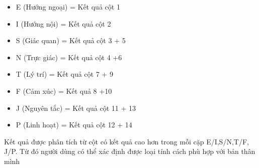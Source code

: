 \begin{itemize}
    \setlength\itemsep{0em}
    \item E (Hướng ngoại) = Kết quả cột 1
    \item I (Hướng nội) = Kết quả cột 2
    \item S (Giác quan)  = Kết quả cột 3 + 5
    \item N (Trực giác) = Kết quả cột 4 +6
    \item T (Lý trí) = Kết quả cột 7 + 9
    \item F (Cảm xúc) = Kết quả 8 +10
    \item J (Nguyên tắc)  = Kết quả cột 11 + 13
    \item P (Linh hoạt) = Kết quả cột 12 + 14
\end{itemize}
Kết quả được phân tích từ cột có kết quả cao hơn trong mỗi cặp E/I,S/N,T/F, J/P. Từ đó người dùng có thể xác định được loại tính cách phù hợp với bản thân mình
